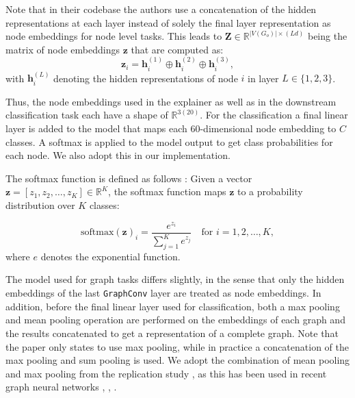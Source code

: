Note that in their codebase the authors use a concatenation of the hidden representations at each layer instead of solely the final layer representation as node embeddings for node level tasks.
This leads to $\mathbf{Z} \in \mathbb{R}^{|V(G_o)|\times (Ld)}$ being the matrix of node embeddings $\mathbf{z}$ that are computed as:
\begin{equation}
    \mathbf{z}_i = \mathbf{h}^{(1)}_i \oplus \mathbf{h}^{(2)}_i \oplus \mathbf{h}^{(3)}_i,
\end{equation}
with $\mathbf{h}^{(L)}_i$ denoting the hidden representations of node $i$ in layer $L \in \{1,2,3\}$.\bigskip


Thus, the node embeddings used in the explainer as well as in the downstream classification task each have a shape of $\mathbb{R}^{3(20)}$. For the classification a final linear layer is added to the model that maps each $60$-dimensional node embedding to $C$ classes. A softmax is applied to the model output to get class probabilities for each node. We also adopt this in our implementation.

The softmax function is defined as follows \cite{Goodfellow-et-al-2016}:
Given a vector \( \mathbf{z} = [z_1, z_2, \dots, z_K] \in \mathbb{R}^K \), the softmax function maps \( \mathbf{z} \) to a probability distribution over \( K \) classes:

\begin{equation}
    \text{softmax}(\mathbf{z})_i = \frac{e^{z_i}}{\sum_{j=1}^{K} e^{z_j}} \quad \text{for } i = 1, 2, \dots, K,
\end{equation}
where $e$ denotes the exponential function. \bigskip

The model used for graph tasks differs slightly, in the sense that only the hidden embeddings of the last \lstinline|GraphConv| layer are treated as node embeddings. In addition, before the final linear layer used for classification, both a max pooling and mean pooling operation are performed on the embeddings of each graph and the results concatenated to get a representation of a complete graph. Note that the paper only states to use max pooling, while in practice a concatenation of the max pooling and sum pooling is used. We adopt the combination of mean pooling and max pooling from the replication study \cite{holdijk2021re}, as this has been used in recent graph neural networks \cite{ma2021unsupervised}, \cite{simonovsky2017dynamic}, \cite{zhao2023faithful}. 


